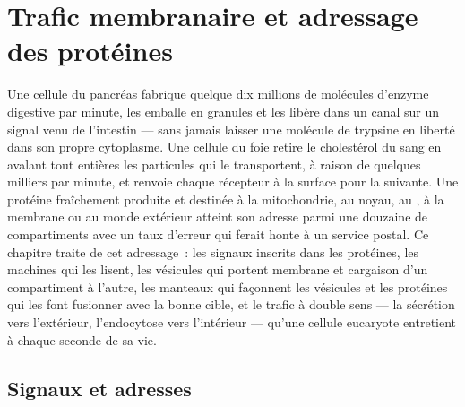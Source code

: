 \chapter{Trafic membranaire et adressage des protéines}\label{ch:b3:membrane-traffic}

Une cellule du pancréas fabrique quelque dix millions de molécules
d'enzyme digestive par minute, les emballe en granules et les libère
dans un canal sur un signal venu de l'intestin --- sans jamais laisser
une molécule de trypsine en liberté dans son propre cytoplasme. Une
cellule du foie retire le cholestérol du sang en avalant tout entières
les particules qui le transportent, à raison de quelques milliers par
minute, et renvoie chaque récepteur à la surface pour la suivante. Une
protéine fraîchement produite et destinée à la mitochondrie, au noyau,
au , à la membrane ou au monde extérieur atteint son adresse
parmi une douzaine de compartiments avec un taux d'erreur qui ferait
honte à un service postal. Ce chapitre traite de cet adressage~: les
signaux inscrits dans les protéines, les machines qui les lisent, les
vésicules qui portent membrane et cargaison d'un compartiment à
l'autre, les manteaux qui façonnent les vésicules et les protéines qui
les font fusionner avec la bonne cible, et le trafic à double sens ---
la sécrétion vers l'extérieur, l'endocytose vers l'intérieur --- qu'une
cellule eucaryote entretient à chaque seconde de sa vie.

\section{Signaux et adresses}

